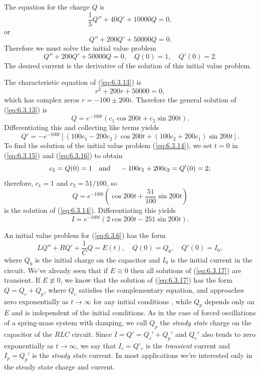 \begin{examplesolution}
\solution The equation for the charge $Q$ is
\[
  \frac{1}{5}Q''+40Q'+10000Q=0,
\]
or
\begin{equation}
  \label{eq:6.3.13}Q''+200Q'+50000Q=0.
\end{equation}
Therefore we must solve the initial value problem
\begin{equation}
  \label{eq:6.3.14}Q''+200Q'+50000Q=0,\quad Q(0)=1,\quad Q'(0)=2.
\end{equation}
The desired current is the derivative of the solution of this initial value problem.

The characteristic equation of (\ref{eq:6.3.13}) is
\[
  r^{2}+200r+50000=0,
\]
which has complex zeros $r=-100\pm200i$. Therefore the general solution of (\ref{eq:6.3.13}) is
\begin{equation}
  \label{eq:6.3.15}Q=e^{-100t}(c_{1}\cos200t+c_{2}\sin200t).
\end{equation}
Differentiating this and collecting like terms yields
\begin{equation}
  \label{eq:6.3.16}Q'=-e^{-100t}\left[(100c_{1}-200c_{2})\cos200t+ (100c_{2}+200c_{1})\sin200t\right].
\end{equation}
To find the solution of the initial value problem (\ref{eq:6.3.14}), we set $t=0$ in
(\ref{eq:6.3.15}) and (\ref{eq:6.3.16}) to obtain
\[
  c_{1}=Q(0)=1\mbox{\quad and \quad}-100c_{1}+200c_{2}=Q'(0)=2;
\]
therefore, $c_{1}=1$ and $c_{2}=51/100$, so
\[
  Q=e^{-100t}\left(\cos200t+\frac{51}{100}\sin200t\right)
\]
is the solution of (\ref{eq:6.3.14}). Differentiating this yields
\[
  I=e^{-100t}(2\cos200t-251\sin200t).
\]
\end{examplesolution}


\noindent
An initial value problem for (\ref{eq:6.3.6}) has the form
\begin{equation}
  \label{eq:6.3.17}LQ''+RQ'+\frac{1}{C}Q=E(t),\quad Q(0)=Q_{0},\quad Q'(0)=I_{0},
\end{equation}
where $Q_{0}$ is the initial charge on the capacitor and $I_{0}$ is the initial current in the
circuit. We've already seen that if $E\equiv0$ then all solutions of (\ref{eq:6.3.17}) are
transient. If $E\not\equiv0$, we know that the solution of (\ref{eq:6.3.17}) has the form
$Q=Q_{c}+Q_{p}$, where $Q_{c}$ satisfies the complementary equation, and approaches zero
exponentially as $t\to\infty$ for any initial conditions , while $Q_{p}$ depends only on $E$ and is
independent of the initial conditions. As in the case of forced oscillations of a spring-mass system
with damping, we call $Q_{p}$ the {\color{blue}\it steady state\/} charge on the capacitor of the
$RLC$ circuit. Since $I=Q'=Q_{c}'+Q_{p}'$ and $Q_{c}'$ also tends to zero exponentially as
$t\to\infty$, we say that $I_{c}=Q'_{c}$ is the {\color{blue}\it transient\/} current and
$I_{p}=Q_{p}'$ is the {\color{blue}\it steady state\/} current. In most applications we're
interested only in the steady state charge and current.

